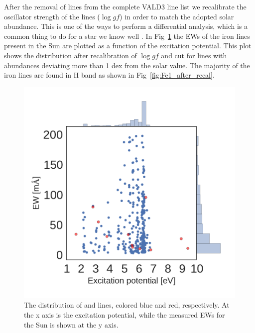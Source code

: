 \documentclass{aa}
\begin{document}
After the removal of lines from the complete VALD3 line list we
recalibrate the oscillator strength of the lines ($\log \mathit{gf}$)
in order to match the adopted solar abundance. This is one of the
ways to perform a differential analysis, which is a common thing
to do for a star we know well \citep{Sousa2008a,Onehag2012}. In
Fig~\ref{fig:Fe1_before_recal} the EWs of the iron lines present in
the Sun are plotted as a function of the excitation potential. This
plot shows the distribution after recalibration of $\log gf$ and cut
for lines with abundances deviating more than 1 dex from the solar
value. The majority of the iron lines are found in H band as shown in
Fig~\ref{fig:Fe1_after_recal}.



\begin{figure}[tpb]
    \centering
    \includegraphics[width=1.0\linewidth]{figures/EWvsEP.pdf}
    \caption{The distribution of  and  lines,
    colored blue and red, respectively. At the x axis is
    the excitation potential, while the measured EWs for the Sun is
    shown at the y axis.}
    \label{fig:Fe1_before_recal}
\end{figure}
\end{document}
